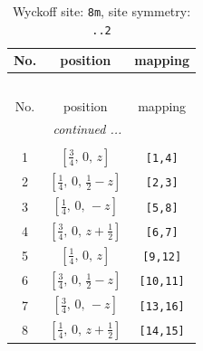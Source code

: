 \documentclass[fleqn,8pt]{jsarticle}
\begin{document}
\begin{longtable}{ccc}
\caption{Wyckoff site: {\tt 8m}, site symmetry: {\tt ..2}}
 \\
 \hline \hline
No. & position & mapping \\ \hline \endfirsthead

\multicolumn{2}{l}{\tablename\ \thetable{}} \\
 \hline \hline
No. & position & mapping \\ \hline \endhead

 \hline \hline
\multicolumn{2}{r}{\footnotesize\it continued ...} \\ \endfoot

 \hline \hline
\multicolumn{2}{r}{} \\ \endlastfoot

1 & $\left[ \frac{3}{4},\, 0,\, z \right]$ & {\tt [1,4]} \\ \hline
2 & $\left[ \frac{1}{4},\, 0,\, \frac{1}{2} - z \right]$ & {\tt [2,3]} \\ \hline
3 & $\left[ \frac{1}{4},\, 0,\, - z \right]$ & {\tt [5,8]} \\ \hline
4 & $\left[ \frac{3}{4},\, 0,\, z + \frac{1}{2} \right]$ & {\tt [6,7]} \\ \hline
5 & $\left[ \frac{1}{4},\, 0,\, z \right]$ & {\tt [9,12]} \\ \hline
6 & $\left[ \frac{3}{4},\, 0,\, \frac{1}{2} - z \right]$ & {\tt [10,11]} \\ \hline
7 & $\left[ \frac{3}{4},\, 0,\, - z \right]$ & {\tt [13,16]} \\ \hline
8 & $\left[ \frac{1}{4},\, 0,\, z + \frac{1}{2} \right]$ & {\tt [14,15]} \\
\end{longtable}
\renewcommand{\arraystretch}{1.2}
\end{document}
